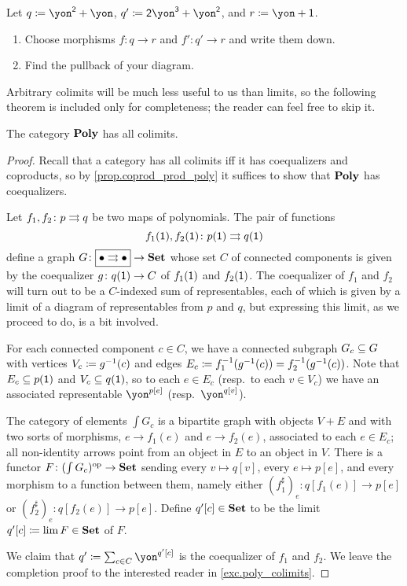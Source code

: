 \documentclass[DynamicalBook]{subfiles}
\begin{document}
\begin{exercise}
Let $q\coloneqq \yon^\2+\yon$, $q'\coloneqq\2\yon^\3+\yon^\2$, and $r\coloneq\yon+\1$.
\begin{enumerate}
	\item Choose morphisms $f\colon q\to r$ and $f'\colon q'\to r$ and write them down.
	\item Find the pullback of your diagram.
\qedhere
\end{enumerate}
\end{exercise}

Arbitrary colimits will be much less useful to us than limits, so the following theorem is included only for completeness; the reader can feel free to skip it.
\begin{theorem}\label{thm.poly_colimits}
The category $\poly$ has all colimits.
\end{theorem}
\begin{proof}
Recall that a category has all colimits iff it has coequalizers and coproducts, so by \cref{prop.coprod_prod_poly} it suffices to show that $\poly$ has coequalizers.

Let $f_1,f_2\colon p\tto q$ be two maps of polynomials. The pair of functions
\[f_1(\1),f_2(\1)\colon p(\1)\tto q(\1)\] 
define a graph $G\colon\fbox{$\bullet\tto\bullet$}\to\smset$ whose set $C$ of connected components is given by the coequalizer $g\colon q(\1)\to C$ of $f_1(\1)$ and $f_2(\1)$. The coequalizer of $f_1$ and $f_2$ will turn out to be a $C$-indexed sum of representables, each of which is given by a limit of a diagram of representables from $p$ and $q$, but expressing this limit, as we proceed to do, is a bit involved.

For each connected component $c\in C$, we have a connected subgraph $G_c\ss G$ with vertices $V_c\coloneqq g\inv(c)$ and edges $E_c\coloneqq f_1\inv(g\inv(c))=f_2\inv(g\inv(c))$. Note that $E_c\ss p(\1)$ and $V_c\ss q(\1)$, so to each $e\in E_c$ (resp.\ to each $v\in V_c$) we have an associated representable $\yon^{p[e]}$ (resp.\ $\yon^{q[v]}$).

The category of elements $\int G_c$ is a bipartite graph with objects $V+E$ and with two sorts of morphisms, $e\to f_1(e)$ and $e\to f_2(e)$, associated to each $e\in E_c$; all non-identity arrows point from an object in $E$ to an object in $V$. There is a functor $F\colon(\int G_c)\op\to\smset$ sending every $v\mapsto q[v]$, every $e\mapsto p[e]$, and every morphism to a function between them, namely either $(f_1^\sharp)_e\colon q[f_1(e)]\to p[e]$ or $(f_2^\sharp)_e\colon q[f_2(e)]\to p[e]$. Define $q'[c]\in\smset$ to be the limit $q'[c]\coloneqq\lim F\in\smset$ of $F$.

We claim that $q'\coloneqq\sum_{c\in C}\yon^{q'[c]}$ is the coequalizer of $f_1$ and $f_2$. We leave the completion proof to the interested reader in \cref{exc.poly_colimits}.
\end{proof}
\end{document}
